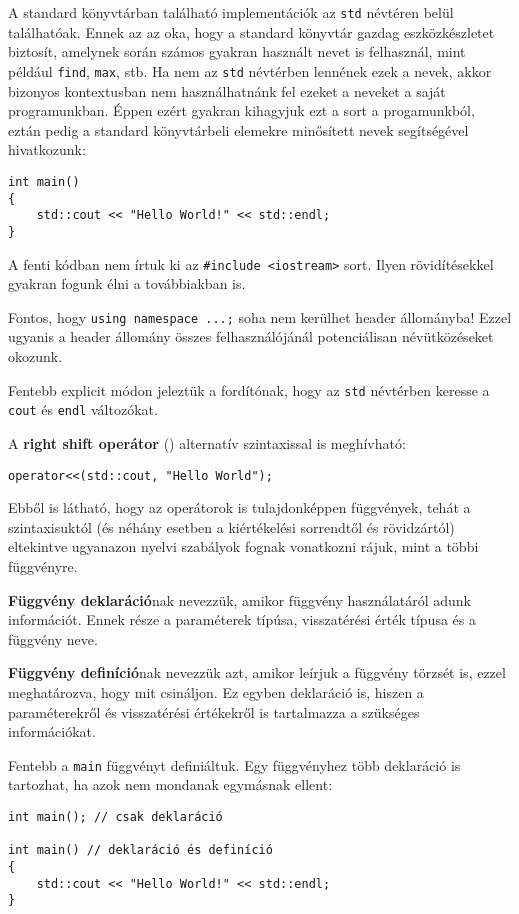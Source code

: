 \documentclass[../cpp_book/cpp_book.tex]{subfiles}
\begin{document}
	A standard könyvtárban található implementációk az \texttt{std} névtéren belül találhatóak. Ennek az az oka, hogy a standard könyvtár gazdag eszközkészletet biztosít, amelynek során számos gyakran használt nevet is felhasznál, mint például \texttt{find}, \texttt{max}, stb. Ha nem az \texttt{std} névtérben lennének ezek a nevek, akkor bizonyos kontextusban nem használhatnánk fel ezeket a neveket a saját programunkban. Éppen ezért gyakran kihagyjuk ezt a sort a progamunkból, eztán pedig a standard könyvtárbeli elemekre minősített nevek segítségével hivatkozunk:
	\begin{lstlisting}
int main()
{
	std::cout << "Hello World!" << std::endl;
}
	\end{lstlisting}
	\begin{note}
		A fenti kódban nem írtuk ki az \texttt{\#include <iostream>} sort. Ilyen rövidítésekkel gyakran fogunk élni a továbbiakban is. 
	\end{note}

	Fontos, hogy \texttt{using namespace ...;} soha nem kerülhet header állományba! Ezzel ugyanis a header állomány összes felhasználójánál potenciálisan névütközéseket okozunk.

	Fentebb explicit módon jeleztük a fordítónak, hogy az \texttt{std} névtérben keresse a \texttt{cout} és \texttt{endl} változókat.
	
	\medskip
	A \textbf{right shift operátor} (\texttt{\<}) alternatív szintaxissal is meghívható:
	\begin{lstlisting}
operator<<(std::cout, "Hello World");
	\end{lstlisting}
	Ebből is látható, hogy az operátorok is tulajdonképpen függvények, tehát a szintaxisuktól (és néhány esetben a kiértékelési sorrendtől és rövidzártól) eltekintve ugyanazon nyelvi szabályok fognak vonatkozni rájuk, mint a többi függvényre.
	
	\medskip
	\textbf{Függvény deklaráció}nak nevezzük, amikor függvény használatáról adunk információt. Ennek része a paraméterek típúsa, visszatérési érték típusa és a függvény neve.
	
	\medskip
	\textbf{Függvény definíció}nak nevezzük azt, amikor leírjuk a függvény törzsét is, ezzel meghatározva, hogy mit csináljon. Ez egyben deklaráció is, hiszen a paraméterekről és visszatérési értékekről is tartalmazza a szükséges információkat.
	
	\medskip
	Fentebb a \texttt{main} függvényt definiáltuk. Egy függvényhez több deklaráció is tartozhat, ha azok nem mondanak egymásnak ellent:
	\begin{lstlisting}
int main(); // csak deklaráció	

int main() // deklaráció és definíció
{
	std::cout << "Hello World!" << std::endl;
}
	\end{lstlisting}
\end{document}
